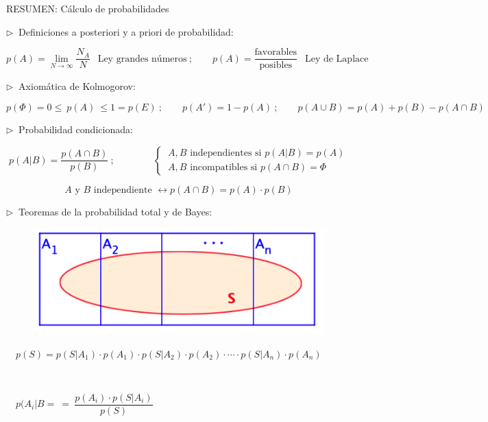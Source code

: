 %

\newpage

$\quad$

$\quad$

\begin{myblock}{RESUMEN: Cálculo de probabilidades}
$\quad$



\vspace{5mm} $\triangleright \ $ Definiciones a posteriori y a priori de probabilidad:

$$p(A)=\lim_{N\to \infty} \dfrac{N_A}{N} \ \ \text{ Ley grandes números} \ ;
\quad \quad
p(A)=\dfrac{\text{favorables}}{\text{posibles}} \ \ \text{ Ley de Laplace}$$

\vspace{5mm} $\triangleright \ $ Axiomática de Kolmogorov:

$$p(\varPhi)=0 \le \ p(A)\ \le 1=p(E)\ ; \qquad
p(A')=1-p(A) \ ; \qquad
p(A\cup B)=p(A)+p(B)-p(A\cap B)  $$

\vspace{5mm} $\triangleright \ $ Probabilidad condicionada:

$$p(A|B)=\dfrac{p(A\cap B)}{p(B)} \ ;
\qquad \qquad 
\left\{ \ 
\begin{matrix}
	A, B \text{ independientes si } p(A|B)=p(A) 
	\\
	A, B \text{ incompatibles si } p(A\cap B)=\varPhi \ \ \ \ 
\end{matrix} \right.$$

$$ A \text{ y } B \text{ independiente } \leftrightarrow p(A\cap B)=p(A) \cdot p(B)$$
 

\vspace{5mm} $\triangleright \ $ Teoremas de la probabilidad total y de Bayes:

	\begin{figure}[H]
			\centering
			\includegraphics[width=.6\textwidth]{imagenes/imagenes02/T02IM22.png}
	\end{figure}

$\quad p(S)=p(S|A_1)\cdot p(A_1) \cdot p(S|A_2)\cdot p(A_2) \cdot \cdots 	\cdot p(S|A_n)\cdot p(A_n) $

$\quad$

$\quad p(A_i|B= \ = \ \dfrac{p(A_i) \cdot p(S|A_i)}{p(S)}$

$\quad$
\end{myblock}



